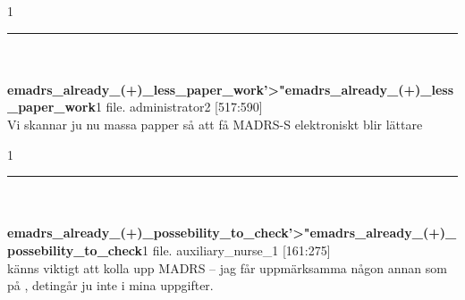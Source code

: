 \documentclass[12pt,a4paper,oneside]{article}
\begin{document}
1 
\hrule
\ \\\ \\{\bf emadrs\_already\_(+)\_less\_paper\_work'>"emadrs\_already\_(+)\_less\_paper\_work}1 file.
 administrator2 [517:590]\\ 
Vi skannar ju nu massa papper s{\aa} att f{\aa} MADRS-S elektroniskt blir l{\"a}ttare %

1 
\hrule
\ \\\ \\{\bf emadrs\_already\_(+)\_possebility\_to\_check'>"emadrs\_already\_(+)\_possebility\_to\_check}1 file.
 auxiliary\_nurse\_1 [161:275]\\ 
 k{\"a}nns viktigt att kolla upp MADRS -- jag f{\aa}r uppm{\"a}rksamma n{\aa}gon annan som p{\aa} , deting{\aa}r ju inte i mina uppgifter. %
\end{document}
